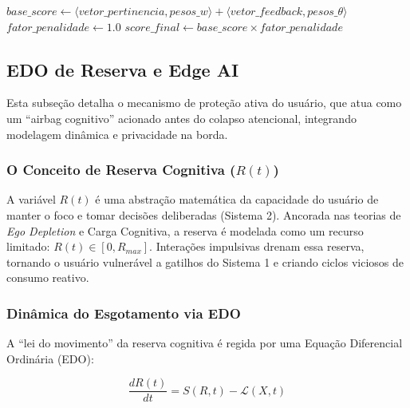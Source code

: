 \documentclass{sbc2023}
\begin{document}
\begin{algorithm}[h]
\caption{Cálculo do Score de Qualidade (Otimização do Sistema 2)}
\label{alg:score}
$base\_score \gets \langle vetor\_pertinencia, pesos\_w \rangle + \langle vetor\_feedback, pesos\_\theta \rangle$\;
$fator\_penalidade \gets 1.0$\;
$score\_final \gets base\_score \times fator\_penalidade$\;
\;
\end{algorithm}

\subsection{EDO de Reserva e Edge AI} \label{sec:edo_method}

Esta subseção detalha o mecanismo de proteção ativa do usuário, que atua como um ``airbag cognitivo'' acionado antes do colapso atencional, integrando modelagem dinâmica e privacidade na borda.

\subsubsection{O Conceito de Reserva Cognitiva ($R(t)$)} \label{sec:edo_concept}

A variável $R(t)$ é uma abstração matemática da capacidade do usuário de manter o foco e tomar decisões deliberadas (Sistema 2). Ancorada nas teorias de \textit{Ego Depletion} e Carga Cognitiva, a reserva é modelada como um recurso limitado: $R(t) \in [0, R_{max}]$. Interações impulsivas drenam essa reserva, tornando o usuário vulnerável a gatilhos do Sistema 1 e criando ciclos viciosos de consumo reativo.

\subsubsection{Dinâmica do Esgotamento via EDO} \label{sec:edo_math}

A ``lei do movimento'' da reserva cognitiva é regida por uma Equação Diferencial Ordinária (EDO):

\begin{equation} \label{eq:edo}
    \frac{dR(t)}{dt} = S(R, t) - \mathcal{L}(X, t)
\end{equation}
\end{document}
